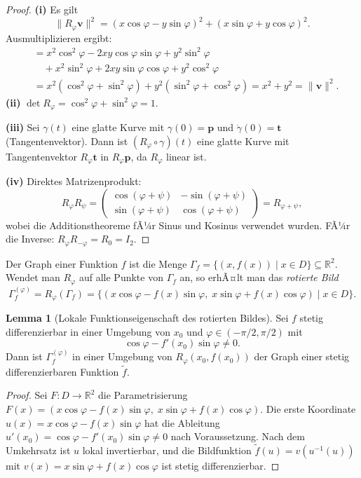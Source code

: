 ﻿\documentclass[12pt, a4paper]{article}
\theoremstyle{definition}
\newtheorem{lemma}{Lemma}[section]
\begin{document}
	\begin{proof}
		\textbf{(i)} Es gilt
		\[
		\|R_\varphi \mathbf{v}\|^2
		= (x\cos\varphi - y\sin\varphi)^2 + (x\sin\varphi + y\cos\varphi)^2.
		\]
		Ausmultiplizieren ergibt:
		\begin{align*}
			&= x^2\cos^2\varphi - 2xy\cos\varphi\sin\varphi + y^2\sin^2\varphi \\
			&\quad + x^2\sin^2\varphi + 2xy\sin\varphi\cos\varphi + y^2\cos^2\varphi \\
			&= x^2(\cos^2\varphi + \sin^2\varphi) + y^2(\sin^2\varphi + \cos^2\varphi)
			= x^2 + y^2 = \|\mathbf{v}\|^2.
		\end{align*}
		\textbf{(ii)} $\det R_\varphi = \cos^2\varphi + \sin^2\varphi = 1$.
		
		\textbf{(iii)} Sei $\gamma(t)$ eine glatte Kurve mit $\gamma(0) = \mathbf{p}$ und
		$\dot\gamma(0) = \mathbf{t}$ (Tangentenvektor). Dann ist $(R_\varphi \circ \gamma)(t)$
		eine glatte Kurve mit Tangentenvektor $R_\varphi \mathbf{t}$ in $R_\varphi \mathbf{p}$,
		da $R_\varphi$ linear ist.
		
		\textbf{(iv)} Direktes Matrizenprodukt:
		\[
		R_\varphi R_\psi = \begin{pmatrix} \cos(\varphi+\psi) & -\sin(\varphi+\psi) \\
			\sin(\varphi+\psi) & \cos(\varphi+\psi) \end{pmatrix} = R_{\varphi+\psi},
		\]
		wobei die Additionstheoreme fÃ¼r Sinus und Kosinus verwendet wurden.
		FÃ¼r die Inverse: $R_\varphi R_{-\varphi} = R_0 = I_2$.
	\end{proof}
	
	Der Graph einer Funktion $f$ ist die Menge
	$\Gamma_f = \{(x, f(x)) \mid x \in D\} \subseteq \mathbb{R}^2$.
	Wendet man $R_\varphi$ auf alle Punkte von $\Gamma_f$ an, so erhÃ¤lt man
	das \emph{rotierte Bild}
	\[
	\Gamma_f^{(\varphi)} = R_\varphi(\Gamma_f)
	= \bigl\{(x\cos\varphi - f(x)\sin\varphi,\; x\sin\varphi + f(x)\cos\varphi)
	\mid x \in D\bigr\}.
	\]
	
	\begin{lemma}[Lokale Funktionseigenschaft des rotierten Bildes]
		\label{lem:lokal}
		Sei $f$ stetig differenzierbar in einer Umgebung von $x_0$ und
		$\varphi \in (-\pi/2, \pi/2)$ mit
		\[
		\cos\varphi - f'(x_0)\sin\varphi \neq 0.
		\]
		Dann ist $\Gamma_f^{(\varphi)}$ in einer Umgebung von
		$R_\varphi(x_0, f(x_0))$ der Graph einer stetig differenzierbaren
		Funktion $\tilde{f}$.
	\end{lemma}
	
	\begin{proof}
		Sei $F: D \to \mathbb{R}^2$ die Parametrisierung
		$F(x) = (x\cos\varphi - f(x)\sin\varphi,\; x\sin\varphi + f(x)\cos\varphi)$.
		Die erste Koordinate $u(x) = x\cos\varphi - f(x)\sin\varphi$ hat die
		Ableitung $u'(x_0) = \cos\varphi - f'(x_0)\sin\varphi \neq 0$ nach Voraussetzung.
		Nach dem Umkehrsatz ist $u$ lokal invertierbar, und die Bildfunktion
		$\tilde{f}(u) = v(u^{-1}(u))$ mit $v(x) = x\sin\varphi + f(x)\cos\varphi$
		ist stetig differenzierbar.
	\end{proof}
	
\end{document}
